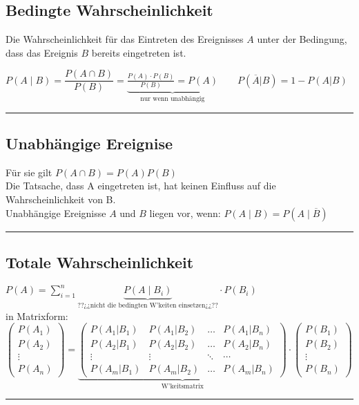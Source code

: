 \subsection{Bedingte Wahrscheinlichkeit }
Die Wahrscheinlichkeit für das Eintreten des Ereignisses $A$ unter der
Bedingung, dass das Ereignis $B$ bereits eingetreten ist.
\begin{center}
  $P(A\mid B)= \dfrac{P(A\cap B)}{P(B)}=\underbrace{\frac{P(A)\cdot
  P(B)}{P(B)}=P(A)}_{\text{nur wenn unabhängig}} \qquad P(\overline{A}|B) = 1 -
  P(A|B)$
\end{center}
\hrule

\subsection{Unabhängige Ereignise }
		Für sie gilt \hspace*{5mm} $P(A\cap B)=P(A)P(B)$\\
    	Die Tatsache, dass A eingetreten ist, hat keinen Einfluss auf die 
		Wahrscheinlichkeit von B.\\
		Unabhängige Ereignisse $A$ und $B$ liegen vor, wenn: 
		\hspace*{5mm} $P(A\mid B)=P(A\mid \overline{B})$ \\		
\hrule

\subsection{Totale Wahrscheinlichkeit }
	$P(A)=\sum\limits_{i=1}^n \underbrace{P(A\mid B_i)}_{\text{??¿¿nicht die bedingten W'keiten einsetzen¿¿??}}\cdot P(B_i)$ \\
	
	in Matrixform: \\
	$\begin{pmatrix}P(A_1)\\P(A_2)\\\vdots\\P(A_n)\end{pmatrix} = 
	\underbrace{\begin{pmatrix}P(A_1|B_1) & P(A_1|B_2) & \ldots & P(A_1|B_n) \\
	P(A_2|B_1) & P(A_2|B_2) & \ldots & P(A_2|B_n) \\
	\vdots & \vdots & \ddots & \cdots \\
	P(A_m|B_1) & P(A_m|B_2) & \ldots & P(A_m|B_n)\end{pmatrix}}_{\text{W'keitsmatrix}}
	\cdot \begin{pmatrix}P(B_1)\\P(B_2)\\\vdots\\P(B_n)\end{pmatrix}$
\hrule

